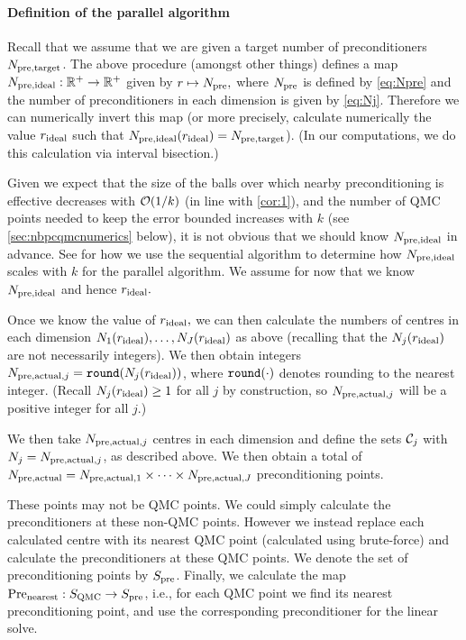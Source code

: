     \paragraph{Definition of the parallel algorithm} Recall that we assume that we are given a target number of preconditioners $N_{\mathrm{pre,target}}$. The above procedure (amongst other things) defines a map $N_{\mathrm{pre,ideal}}:\mathbb R^{+} \rightarrow \mathbb R^{+}$ given by $r \mapsto N_{\mathrm{pre}},$ where $N_{\mathrm{pre}}$ is defined by \cref{eq:Npre} and the number of preconditioners in each dimension is given by \cref{eq:Nj}.  Therefore we can numerically invert this map (or more precisely, calculate numerically the value $r_{\mathrm{ideal}}$ such that $N_{\mathrm{pre,ideal}}(r_{\mathrm{ideal}}) = N_{\mathrm{pre,target}}$). (In our computations, we do this calculation via interval bisection.)

Given we expect that the size of the balls over which nearby preconditioning is effective decreases with $\cO\mleft(1/k\mright)$ (in line with \cref{cor:1}), and the number of QMC points needed to keep the error bounded increases with $k$ (see \cref{sec:nbpcqmcnumerics} below), it is not obvious that we should know $N_{\mathrm{pre,ideal}}$ in advance. See  for how we use the sequential algorithm to determine how $N_{\mathrm{pre,ideal}}$ scales with $k$ for the parallel algorithm. We assume for now that we know $N_{\mathrm{pre,ideal}}$ and hence $r_{\mathrm{ideal}}.$

    Once we know the value of $r_{\mathrm{ideal}},$ we can then calculate the numbers of centres in each dimension $N_{1}(r_{\mathrm{ideal}}),\ldots,N_{J}(r_{\mathrm{ideal}})$ as above (recalling that the $N_{j}(r_{\mathrm{ideal}})$ are not necessarily integers). We then obtain integers $\Npreactualj = \round{\Nj(\rideal)}$, where $\round{\cdot}$ denotes rounding to the nearest integer. (Recall $N_{j}(r_{\mathrm{ideal}}) \geq 1$ for all $j$ by construction, so $N_{\mathrm{pre,actual},j}$ will be a positive integer for all $j.$)

We then take $N_{\mathrm{pre,actual},j}$ centres in each dimension and define the sets $\mathcal C_{j}$ with $N_{j} = N_{\mathrm{pre,actual},j}$, as described above. We then obtain a total of $N_{\mathrm{pre,actual}} = N_{\mathrm{pre,actual},1} \times \cdots \times N_{\mathrm{pre,actual},J}$ preconditioning points.

These points may not be QMC points. We could simply calculate the preconditioners at these non-QMC points. However we instead replace each calculated centre with its nearest QMC point (calculated using brute-force) and calculate the preconditioners at these QMC points. We denote the set of preconditioning points by $S_{\mathrm{pre}}$. Finally, we calculate the map $\mathrm{Pre}_{\mathrm{nearest}}:S_{\mathrm{QMC}}\rightarrow S_{\mathrm{pre}}$, i.e., for each QMC point we find its nearest preconditioning point, and use the corresponding preconditioner for the linear solve.

